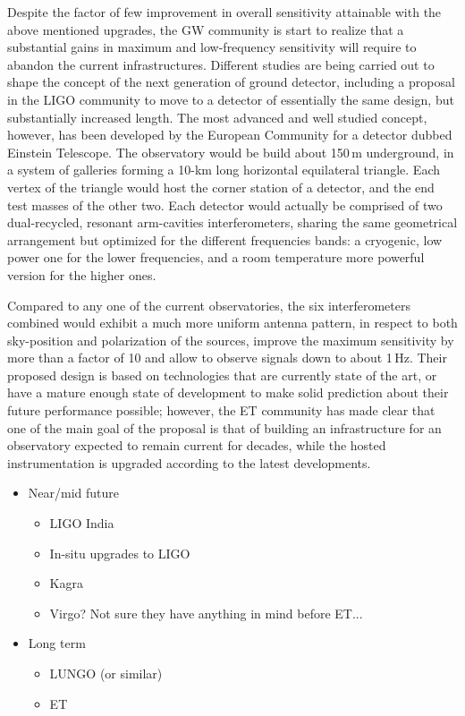 Despite the factor of few improvement in overall sensitivity attainable with the above mentioned upgrades, the GW community is start to realize that a substantial gains in maximum and low-frequency sensitivity will require to abandon the current infrastructures. Different studies are being carried out to shape the concept of the next generation of ground detector, including a proposal in the LIGO community to move to a detector of essentially the same design, but substantially increased length. The most advanced and well studied concept, however, has been developed by the European Community for a detector dubbed Einstein Telescope.
The observatory would be build about 150\,m underground, in a system of galleries forming a 10-km long horizontal equilateral triangle. Each vertex of the triangle would host the corner station of a detector, and the end test masses of the other two. Each detector would actually be comprised of two dual-recycled, resonant arm-cavities interferometers, sharing the same geometrical arrangement but optimized for the different frequencies bands: a cryogenic, low power one for the lower frequencies, and a room temperature more powerful version for the higher ones.

Compared to any one of the current observatories, the six interferometers combined would exhibit a much more uniform antenna pattern, in respect to both sky-position and polarization of the sources, improve the maximum sensitivity by more than a factor of 10 and allow to observe signals down to about 1\,Hz. Their proposed design is based on technologies that are currently state of the art, or have a mature enough state of development to make solid prediction about their future performance possible; however, the ET community has made clear that one of the main goal of the proposal is that of building an infrastructure for an observatory expected to remain current for decades, while the hosted instrumentation is upgraded according to the latest developments.

\begin{itemize}
	\item Near/mid future
	\begin{itemize}
		\item LIGO India
		\item In-situ upgrades to LIGO
		\item Kagra
		\item Virgo? Not sure they have anything in mind before ET...
	\end{itemize}
	\item Long term
	\begin{itemize}
		\item LUNGO (or similar)~\cite{Dwyer2015}
		\item ET~\cite{Punturo2010}
	\end{itemize}
\end{itemize}
